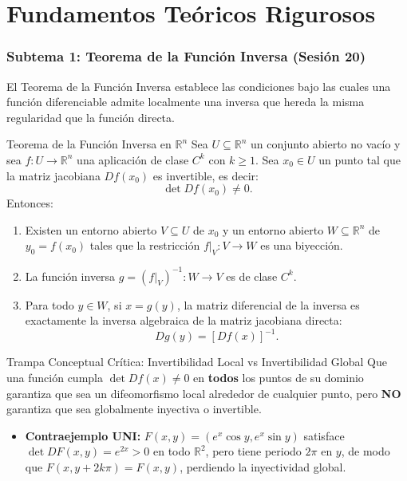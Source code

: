 \documentclass[11pt,a4paper]{article}
\begin{document}
\tableofcontents
\newpage

\part{Fundamentos Teóricos Rigurosos}

\section{Subtema 1: Teorema de la Función Inversa (Sesión 20)}

El Teorema de la Función Inversa establece las condiciones bajo las cuales una función diferenciable admite localmente una inversa que hereda la misma regularidad que la función directa.

\begin{theorempage}{Teorema de la Función Inversa en $\mathbb{R}^n$}
Sea $U \subseteq \mathbb{R}^n$ un conjunto abierto no vacío y sea $f: U \to \mathbb{R}^n$ una aplicación de clase $C^k$ con $k \ge 1$. Sea $x_0 \in U$ un punto tal que la matriz jacobiana $Df(x_0)$ es invertible, es decir:
\[
\det Df(x_0) \neq 0.
\]
Entonces:
\begin{enumerate}[label=\textbf{\alph*)}]
    \item Existen un entorno abierto $V \subseteq U$ de $x_0$ y un entorno abierto $W \subseteq \mathbb{R}^n$ de $y_0 = f(x_0)$ tales que la restricción $f|_V: V \to W$ es una biyección.
    \item La función inversa $g = (f|_V)^{-1}: W \to V$ es de clase $C^k$.
    \item Para todo $y \in W$, si $x = g(y)$, la matriz diferencial de la inversa es exactamente la inversa algebraica de la matriz jacobiana directa:
    \[
    Dg(y) = \left[ Df(x) \right]^{-1}.
    \]
\end{enumerate}
\end{theorempage}

\begin{cautionbox}{Trampa Conceptual Crítica: Invertibilidad Local vs Invertibilidad Global}
Que una función cumpla $\det Df(x) \neq 0$ en \textbf{todos} los puntos de su dominio garantiza que sea un difeomorfismo local alrededor de cualquier punto, pero \textbf{NO} garantiza que sea globalmente inyectiva o invertible.
\begin{itemize}[noitemsep]
    \item \textbf{Contraejemplo UNI:} $F(x,y) = (e^x\cos y, e^x\sin y)$ satisface $\det DF(x,y) = e^{2x} > 0$ en todo $\mathbb{R}^2$, pero tiene periodo $2\pi$ en $y$, de modo que $F(x, y + 2k\pi) = F(x,y)$, perdiendo la inyectividad global.
\end{itemize}
\end{cautionbox}
\end{document}
